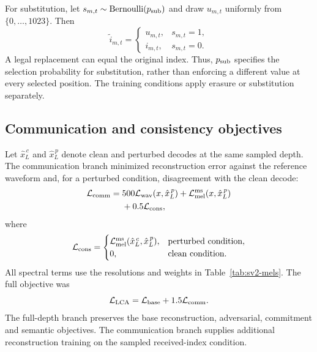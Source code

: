 For substitution, let $s_{m,t}\sim\operatorname{Bernoulli}(p_{\rm sub})$ and draw $u_{m,t}$ uniformly from $\{0,\ldots,1023\}$. Then
\begin{equation}
 \widetilde i_{m,t}=
 \begin{cases}
 u_{m,t}, & s_{m,t}=1,\\
 i_{m,t}, & s_{m,t}=0.
 \end{cases}
 \label{eq:sv2-substitution}
\end{equation}
A legal replacement can equal the original index. Thus, $p_{\rm sub}$ specifies the selection probability for substitution, rather than enforcing a different value at every selected position. The training conditions apply erasure or substitution separately.

\subsection{Communication and consistency objectives}
Let $\hat x_L^{\,c}$ and $\hat x_L^{\,p}$ denote clean and perturbed decodes at the same sampled depth. The communication branch minimized reconstruction error against the reference waveform and, for a perturbed condition, disagreement with the clean decode:
\begin{equation}
\begin{split}
 \mathcal L_{\rm comm}={}&
 500\mathcal L_{\rm wav}(x,\hat x_L^{\,p})
 +\mathcal L_{\rm mel}^{\rm ms}(x,\hat x_L^{\,p})\\
 &+0.5\mathcal L_{\rm cons},
\end{split}
\label{eq:sv2-comm}
\end{equation}
where
\begin{equation}
 \mathcal L_{\rm cons}=
 \begin{cases}
 \mathcal L_{\rm mel}^{\rm ms}(\hat x_L^{\,c},\hat x_L^{\,p}),
       & \text{perturbed condition},\\
 0,    & \text{clean condition}.
 \end{cases}
 \label{eq:sv2-consistency}
\end{equation}
All spectral terms use the resolutions and weights in Table~\ref{tab:sv2-mels}. The full objective was
\begin{equation}
 \mathcal L_{\rm LCA}
 =\mathcal L_{\rm base}+1.5\mathcal L_{\rm comm}.
 \label{eq:sv2-lca}
\end{equation}
The full-depth branch preserves the base reconstruction, adversarial, commitment and semantic objectives. The communication branch supplies additional reconstruction training on the sampled received-index condition.

